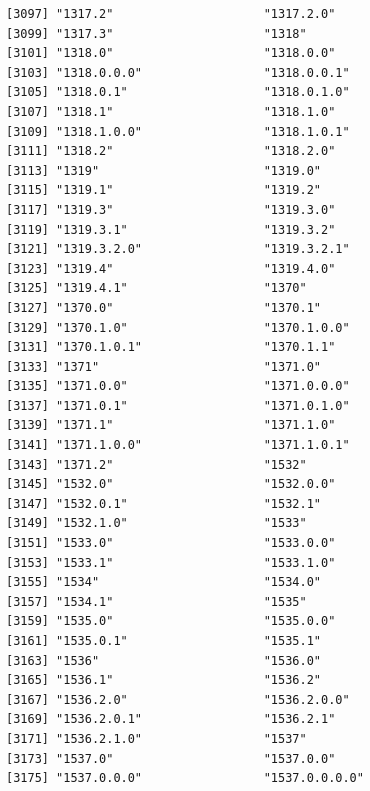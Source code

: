 \documentclass[
  letterpaper,
  DIV=11,
  numbers=noendperiod]{scrreprt}
\begin{document}
\begin{verbatim}
[3097] "1317.2"                     "1317.2.0"                  
[3099] "1317.3"                     "1318"                      
[3101] "1318.0"                     "1318.0.0"                  
[3103] "1318.0.0.0"                 "1318.0.0.1"                
[3105] "1318.0.1"                   "1318.0.1.0"                
[3107] "1318.1"                     "1318.1.0"                  
[3109] "1318.1.0.0"                 "1318.1.0.1"                
[3111] "1318.2"                     "1318.2.0"                  
[3113] "1319"                       "1319.0"                    
[3115] "1319.1"                     "1319.2"                    
[3117] "1319.3"                     "1319.3.0"                  
[3119] "1319.3.1"                   "1319.3.2"                  
[3121] "1319.3.2.0"                 "1319.3.2.1"                
[3123] "1319.4"                     "1319.4.0"                  
[3125] "1319.4.1"                   "1370"                      
[3127] "1370.0"                     "1370.1"                    
[3129] "1370.1.0"                   "1370.1.0.0"                
[3131] "1370.1.0.1"                 "1370.1.1"                  
[3133] "1371"                       "1371.0"                    
[3135] "1371.0.0"                   "1371.0.0.0"                
[3137] "1371.0.1"                   "1371.0.1.0"                
[3139] "1371.1"                     "1371.1.0"                  
[3141] "1371.1.0.0"                 "1371.1.0.1"                
[3143] "1371.2"                     "1532"                      
[3145] "1532.0"                     "1532.0.0"                  
[3147] "1532.0.1"                   "1532.1"                    
[3149] "1532.1.0"                   "1533"                      
[3151] "1533.0"                     "1533.0.0"                  
[3153] "1533.1"                     "1533.1.0"                  
[3155] "1534"                       "1534.0"                    
[3157] "1534.1"                     "1535"                      
[3159] "1535.0"                     "1535.0.0"                  
[3161] "1535.0.1"                   "1535.1"                    
[3163] "1536"                       "1536.0"                    
[3165] "1536.1"                     "1536.2"                    
[3167] "1536.2.0"                   "1536.2.0.0"                
[3169] "1536.2.0.1"                 "1536.2.1"                  
[3171] "1536.2.1.0"                 "1537"                      
[3173] "1537.0"                     "1537.0.0"                  
[3175] "1537.0.0.0"                 "1537.0.0.0.0"              

\end{verbatim}
\end{document}
